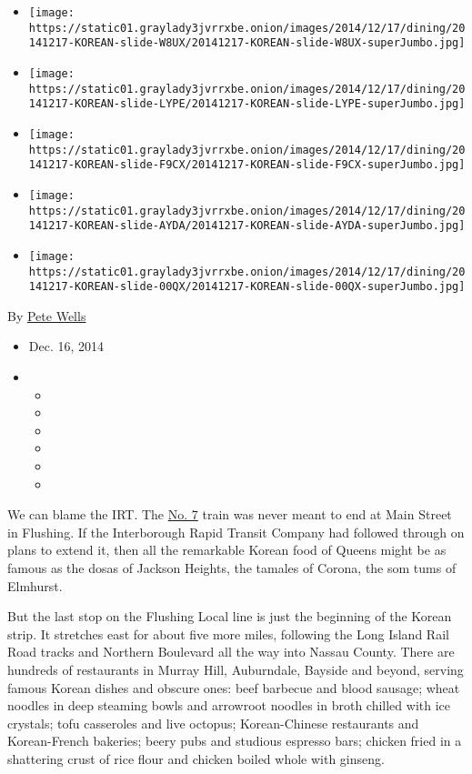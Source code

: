 \begin{itemize}
\item
  \texttt{[image: https://static01.graylady3jvrrxbe.onion/images/2014/12/17/dining/20141217-KOREAN-slide-W8UX/20141217-KOREAN-slide-W8UX-superJumbo.jpg]}
\item
  \texttt{[image: https://static01.graylady3jvrrxbe.onion/images/2014/12/17/dining/20141217-KOREAN-slide-LYPE/20141217-KOREAN-slide-LYPE-superJumbo.jpg]}
\item
  \texttt{[image: https://static01.graylady3jvrrxbe.onion/images/2014/12/17/dining/20141217-KOREAN-slide-F9CX/20141217-KOREAN-slide-F9CX-superJumbo.jpg]}
\item
  \texttt{[image: https://static01.graylady3jvrrxbe.onion/images/2014/12/17/dining/20141217-KOREAN-slide-AYDA/20141217-KOREAN-slide-AYDA-superJumbo.jpg]}
\item
  \texttt{[image: https://static01.graylady3jvrrxbe.onion/images/2014/12/17/dining/20141217-KOREAN-slide-00QX/20141217-KOREAN-slide-00QX-superJumbo.jpg]}
\end{itemize}

By \href{http://www.nytimes3xbfgragh.onion/by/pete-wells}{Pete Wells}

\begin{itemize}
\item
  Dec. 16, 2014
\item
  \begin{itemize}
  \item
  \item
  \item
  \item
  \item
  \item
  \end{itemize}
\end{itemize}

We can blame the IRT. The
\href{http://www.nycsubway.org/wiki/IRT_Flushing_Line}{No. 7} train was
never meant to end at Main Street in Flushing. If the Interborough Rapid
Transit Company had followed through on plans to extend it, then all the
remarkable Korean food of Queens might be as famous as the dosas of
Jackson Heights, the tamales of Corona, the som tums of Elmhurst.

But the last stop on the Flushing Local line is just the beginning of
the Korean strip. It stretches east for about five more miles, following
the Long Island Rail Road tracks and Northern Boulevard all the way into
Nassau County. There are hundreds of restaurants in Murray Hill,
Auburndale, Bayside and beyond, serving famous Korean dishes and obscure
ones: beef barbecue and blood sausage; wheat noodles in deep steaming
bowls and arrowroot noodles in broth chilled with ice crystals; tofu
casseroles and live octopus; Korean-Chinese restaurants and
Korean-French bakeries; beery pubs and studious espresso bars; chicken
fried in a shattering crust of rice flour and chicken boiled whole with
ginseng.

